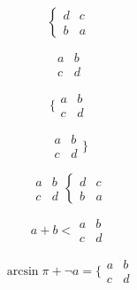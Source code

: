 \documentclass{article}
\def\mockarray{\begin{array}{cc} 
  a & b \\
  c & d \end{array}}
\def\mockcases{\begin{cases}
  d & c \\
  b & a \end{cases}}
\begin{document}
\[\mockcases\]

\[\mockarray\]
  
\[\{ \mockarray\]
  
\[\mockarray \}\]

\[ \mockarray \mockcases \]

\[ a + b < \mockarray \]

\[ \arcsin \pi + \neg a = \{ \mockarray \]
\end{document}
